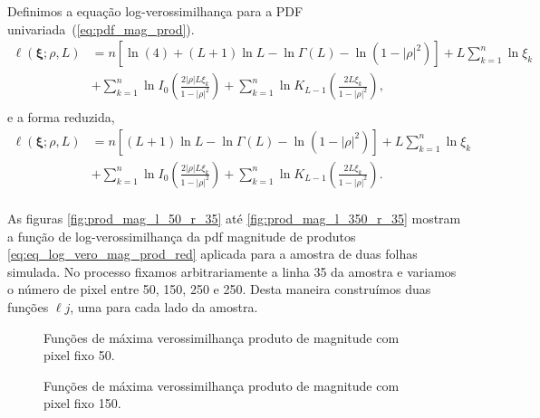 Definimos a equação log-verossimilhança para a PDF univariada~(\ref{eq:pdf_mag_prod}).
\begin{equation}\nonumber
\begin{split}
    \ell(\bm\xi;\rho, L)&=n\left[\ln (4)+(L+1)\ln L-\ln\Gamma(L)-\ln(1-|\rho|^2)\right]+L\sum_{k=1}^{n} \ln\xi_k\\
                         &+\sum_{k=1}^{n}\ln I_0\left(\frac{2|\rho|L\xi_k}{1-|\rho|^2}\right)+ \sum_{k=1}^{n}\ln K_{L-1}\left(\frac{2L\xi_k}{1-|\rho|^2}\right),\\
\end{split}
 \end{equation}
e a forma reduzida,
\begin{equation}\label{eq:eq_log_vero_mag_prod_red}
\begin{split}
    \ell(\bm \xi;\rho, L)&=n\left[(L+1)\ln L-\ln\Gamma(L)-\ln(1-|\rho|^2)\right]+L\sum_{k=1}^{n} \ln\xi_k\\
                         &+\sum_{k=1}^{n}\ln I_0\left(\frac{2|\rho|L\xi_k}{1-|\rho|^2}\right)+ \sum_{k=1}^{n}\ln K_{L-1}\left(\frac{2L\xi_k}{1-|\rho|^2}\right).\\
\end{split}
 \end{equation} 



As figuras \eqref{fig:prod_mag_l_50_r_35} até \eqref{fig:prod_mag_l_350_r_35} mostram a função de log-verossimilhança da pdf magnitude de produtos \eqref{eq:eq_log_vero_mag_prod_red} aplicada para a amostra de duas folhas simulada. No processo fixamos arbitrariamente a linha 35 da amostra e variamos o número de pixel entre 50, 150, 250 e 250. Desta maneira construímos duas funções $\ell{j}$, uma para cada lado da amostra.
 \begin{figure*}[hbt]
	\centering
     \caption{Funções de máxima verossimilhança produto de magnitude com pixel fixo 50.}
     \label{fig:prod_mag_l_50_r_35} 
   \end{figure*}
   
   \begin{figure*}[hbt]
	\centering
     \caption{Funções de máxima verossimilhança produto de magnitude com pixel fixo 150.}
     \label{fig:prod_mag_l_150_r_35} 
   \end{figure*}

